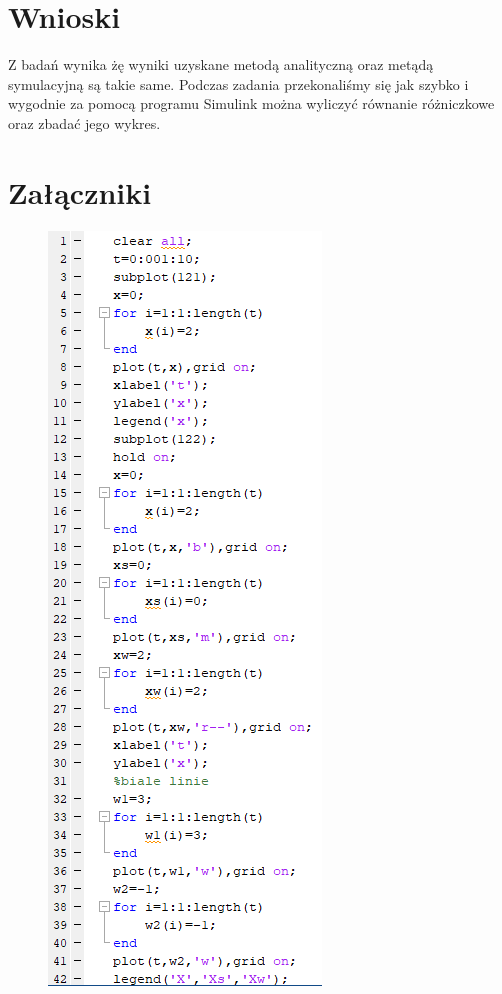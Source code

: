 \documentclass{article}
\begin{document}
\section{Wnioski}
Z badań wynika żę wyniki uzyskane metodą analityczną oraz metądą symulacyjną są takie same. Podczas zadania przekonaliśmy się jak szybko i wygodnie za pomocą programu Simulink można wyliczyć równanie różniczkowe oraz zbadać jego wykres. 
\section{Załączniki}
\begin{figure}
    \centering
    \includegraphics{kod1.png}
    \label{fig:my_label}
\end{figure}
\end{document}
